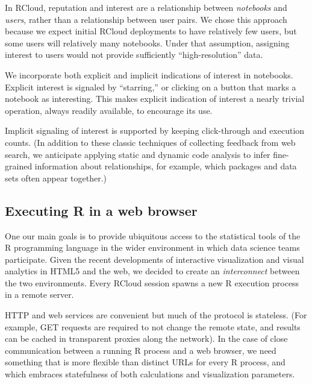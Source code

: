 In RCloud, reputation and interest are a relationship between
\emph{notebooks} and \emph{users}, rather than a relationship between
user pairs. We chose this approach because we expect initial 
RCloud deployments to have relatively few users, but some users will
relatively many notebooks. Under that assumption, assigning
interest to users would not provide sufficiently ``high-resolution'' data.

We incorporate both explicit and implicit indications of interest
in notebooks. Explicit interest is signaled by ``starring,'' or
clicking on a button that marks a notebook as interesting.
This makes explicit indication of interest a nearly trivial operation,
always readily available, to encourage its use.

Implicit signaling of interest is supported by keeping click-through
\cite{Joachims:2005:AIC} and execution counts. (In addition to these
classic techniques of collecting feedback from web search, we anticipate
applying static and dynamic code analysis to infer fine-grained
information about relationships, for example, which packages and data
sets often appear together.)

\subsection{Executing R in a web browser\label{sec:Rinbrowser}}

One our main goals is to provide ubiquitous access to the statistical
tools of the R programming language in the wider environment in which data
science teams participate.
%
Given the recent developments of interactive visualization and visual
analytics in HTML5 and the web, we decided to create an
\emph{interconnect} between the two environments.
%
Every RCloud session spawns a new R execution process in a remote
server.


HTTP and web services are convenient but much of the protocol is
stateless. (For example, GET requests are required to not change the
remote state, and results can be cached in transparent proxies along
the network). In the case of close communication between a running
R process and a web browser, we need something that is more flexible
than distinct URLs for every R process, and which embraces
statefulness of both calculations and visualization parameters.

